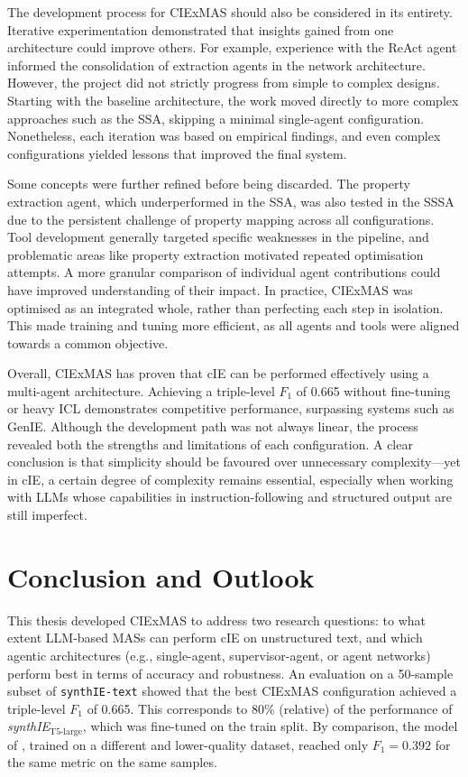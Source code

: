 \documentclass[a4paper,oneside,bibliography=totoc]{scrbook}
\begin{document}
The development process for CIExMAS should also be considered in its entirety. Iterative experimentation demonstrated that insights gained from one architecture could improve others. For example, experience with the ReAct agent informed the consolidation of extraction agents in the network architecture. However, the project did not strictly progress from simple to complex designs. Starting with the baseline architecture, the work moved directly to more complex approaches such as the \ac{SSA}, skipping a minimal single-agent configuration. Nonetheless, each iteration was based on empirical findings, and even complex configurations yielded lessons that improved the final system.

Some concepts were further refined before being discarded. The property extraction agent, which underperformed in the \ac{SSA}, was also tested in the \ac{SSSA} due to the persistent challenge of property mapping across all configurations. Tool development generally targeted specific weaknesses in the pipeline, and problematic areas like property extraction motivated repeated optimisation attempts. A more granular comparison of individual agent contributions could have improved understanding of their impact. In practice, CIExMAS was optimised as an integrated whole, rather than perfecting each step in isolation. This made training and tuning more efficient, as all agents and tools were aligned towards a common objective.

Overall, CIExMAS has proven that \ac{cIE} can be performed effectively using a multi-agent architecture. Achieving a triple-level $F_{1}$ of 0.665 without fine-tuning or heavy \ac{ICL} demonstrates competitive performance, surpassing systems such as GenIE. Although the development path was not always linear, the process revealed both the strengths and limitations of each configuration. A clear conclusion is that simplicity should be favoured over unnecessary complexity—yet in \ac{cIE}, a certain degree of complexity remains essential, especially when working with \acp{LLM} whose capabilities in instruction-following and structured output are still imperfect.

\chapter{Conclusion and Outlook}
\label{ch:conclusion_outlook}

This thesis developed CIExMAS to address two research questions: to what extent \ac{LLM}-based \acp{MAS} can perform \ac{cIE} on unstructured text, and which agentic architectures (e.g., single-agent, supervisor-agent, or agent networks) perform best in terms of accuracy and robustness. An evaluation on a 50-sample subset of \texttt{synthIE-text} showed that the best CIExMAS configuration achieved a triple-level $F_{1}$ of 0.665. This corresponds to 80\% (relative) of the performance of \textit{synthIE}$_{\text{T5-large}}$, which was fine-tuned on the train split. By comparison, the model of \citet{Josifoski2021}, trained on a different and lower-quality dataset, reached only $F_{1}=0.392$ for the same metric on the same samples.
\end{document}
